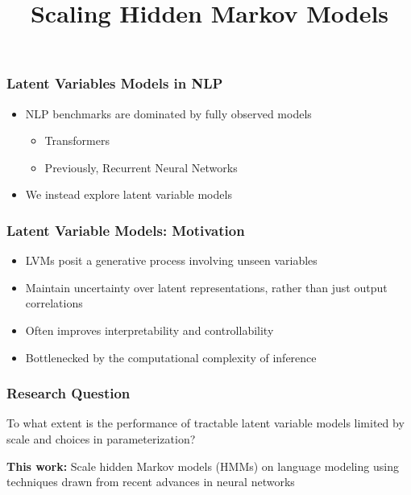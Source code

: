 \documentclass{beamer}
\title{Scaling Hidden Markov Models}
\begin{document}
\frame{\titlepage}

\begin{frame}
\frametitle{Latent Variables Models in NLP}
\begin{itemize}
\item NLP benchmarks are dominated by fully observed models
\vspace{2em}
    \begin{itemize}
    \item Transformers
    \vspace{2em}
    \item Previously, Recurrent Neural Networks
    \end{itemize}
\vspace{2em}
\item We instead explore latent variable models
\end{itemize}
\end{frame}

\begin{frame}
\frametitle{Latent Variable Models: Motivation}
\begin{itemize}
\item LVMs posit a generative process involving unseen variables
\vspace{2em}
\item Maintain uncertainty over latent representations,
    rather than just output correlations
\vspace{2em}
\item Often improves interpretability and controllability
\vspace{2em}
\item Bottlenecked by the computational complexity of inference
\end{itemize}
\end{frame}

\begin{frame}
\frametitle{Research Question}
To what extent is the performance of tractable
latent variable models limited by scale and choices in parameterization?

\vspace{2em}

\textbf{This work:} Scale hidden Markov models (HMMs) on
language modeling using techniques
drawn from recent advances in neural networks
\end{frame}

\end{document}

